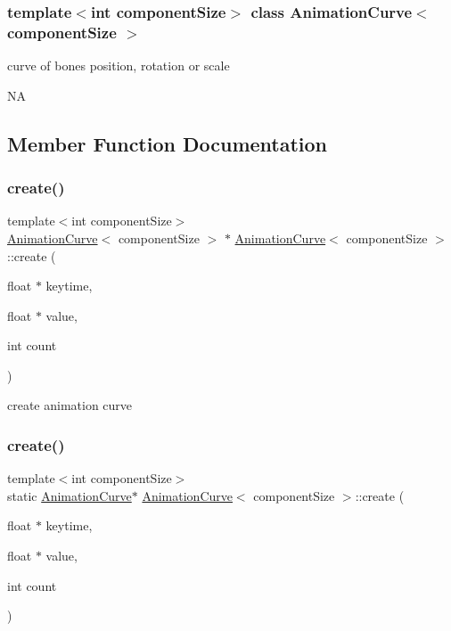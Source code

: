 \subsubsection*{template$<$int component\+Size$>$\newline
class Animation\+Curve$<$ component\+Size $>$}

curve of bone\textquotesingle{}s position, rotation or scale 

NA 

\subsection{Member Function Documentation}
\mbox{\label{classAnimationCurve_a685f50c57ffcc554eeeece259442c16e}} 
\subsubsection{\texorpdfstring{create()}{create()}\hspace{0.1cm}{\footnotesize\ttfamily [1/2]}}
{\footnotesize\ttfamily template$<$int component\+Size$>$ \\
\hyperlink{classAnimationCurve}{Animation\+Curve}$<$ component\+Size $>$ $\ast$ \hyperlink{classAnimationCurve}{Animation\+Curve}$<$ component\+Size $>$\+::create (\begin{DoxyParamCaption}\item[{float $\ast$}]{keytime,  }\item[{float $\ast$}]{value,  }\item[{int}]{count }\end{DoxyParamCaption})\hspace{0.3cm}{\ttfamily [static]}}

create animation curve \mbox{\label{classAnimationCurve_a1911ef899220e06e7e3b92078fe4bd89}} 
\subsubsection{\texorpdfstring{create()}{create()}\hspace{0.1cm}{\footnotesize\ttfamily [2/2]}}
{\footnotesize\ttfamily template$<$int component\+Size$>$ \\
static \hyperlink{classAnimationCurve}{Animation\+Curve}$\ast$ \hyperlink{classAnimationCurve}{Animation\+Curve}$<$ component\+Size $>$\+::create (\begin{DoxyParamCaption}\item[{float $\ast$}]{keytime,  }\item[{float $\ast$}]{value,  }\item[{int}]{count }\end{DoxyParamCaption})\hspace{0.3cm}{\ttfamily [static]}}

